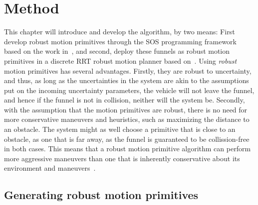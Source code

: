 \chapter{Method}

This chapter will introduce and develop the \rrtfunnel{} algorithm, by two
means: First develop robust motion primitives through the \ac{SOS} programming
framework based on the work in~\cite{majumdarFunnelLibrariesRealtime2017}, and
second, deploy these funnels as robust motion primitives in a discrete \ac{RRT}
robust motion planner based on~\cite{lavalleLav98cPdf}. Using \textit{robust}
motion primitives has several advantages. Firstly, they are robust to
uncertainty, and thus, as long as the uncertainties in the system are akin to
the assumptions put on the incoming uncertainty parameters, the vehicle will not
leave the funnel, and hence if the funnel is not in collision, neither will the
system be. Secondly, with the assumption that the motion primitives are robust,
there is no need for more conservative maneuvers and heuristics, such as
maximizing the distance to an obstacle. The system might as well choose a
primitive that is close to an obstacle, as one that is far away, as the funnel
is guaranteed to be collission-free in both cases. This means that a robust
motion primitive algorithm can perform more aggressive maneuvers than one that
is inherently conservative about its environment and
maneuvers~\cite{singhRobustOnlineMotion2017}.

\section{Generating robust motion primitives}

